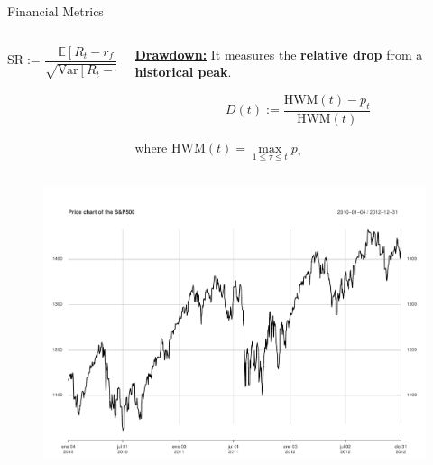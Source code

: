 \documentclass[usenames,dvipsnames]{beamer} %
\begin{document}
\begin{frame}{Financial Metrics}
\begin{columns}
\begin{column}{.5\textwidth}
\begin{equation*}
	\text{SR} := \frac{\mathbb{E}[R_t - r_f]}{\sqrt{\text{Var}[R_t - r_f]}}
\end{equation*}
\end{column}

\begin{column}{.5\textwidth}

\textbf{\underline{Drawdown:}} It measures the \textbf{relative drop} from a 
\textbf{historical peak}.

\begin{equation*} 
	D(t) := \frac{\text{HWM}(t) - p_t}{\text{HWM}(t)}
\end{equation*}

where $\text{HWM}(t) = \max\limits_{1 \leq \tau \leq t} p_{\tau}$

\end{column}
\end{columns}

\vspace{-.5cm}
\begin{columns}
\begin{column}{.5\textwidth}
\begin{figure}
	\includegraphics[scale=.2]{img/priceBasic}
\end{figure}
\end{column}


\end{columns}
\end{frame}
\end{document}
